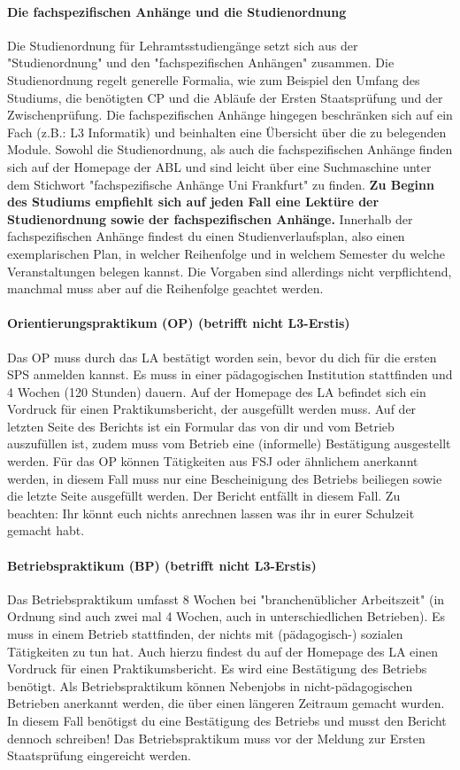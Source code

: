 \paragraph{Die fachspezifischen Anhänge und die Studienordnung}
Die Studienordnung für Lehramtsstudiengänge setzt sich aus der
"Studienordnung" und den "fachspezifischen Anhängen" zusammen. Die Studienordnung regelt generelle Formalia, wie zum Beispiel den Umfang des Studiums, die benötigten CP und die Abläufe der Ersten Staatsprüfung und der Zwischenprüfung.
Die fachspezifischen Anhänge hingegen beschränken sich auf ein Fach (z.B.: L3 Informatik) und beinhalten eine Übersicht über die zu belegenden Module.
Sowohl die Studienordnung, als auch die fachspezifischen Anhänge finden sich auf der Homepage der ABL und sind leicht über eine Suchmaschine unter dem Stichwort "fachspezifische Anhänge Uni Frankfurt" zu finden.
\textbf{Zu Beginn des Studiums empfiehlt sich auf jeden Fall eine Lektüre der Studienordnung sowie der fachspezifischen Anhänge.}
Innerhalb der fachspezifischen Anhänge findest du einen Studienverlaufsplan, also einen exemplarischen Plan, in welcher Reihenfolge und in welchem Semester du welche Veranstaltungen belegen kannst. Die Vorgaben sind allerdings nicht verpflichtend, manchmal muss aber auf die Reihenfolge geachtet werden.

\paragraph{Orientierungspraktikum (OP) (betrifft nicht L3-Erstis)}
Das OP muss durch das LA bestätigt worden sein, bevor du dich für die ersten SPS anmelden kannst. Es muss in einer pädagogischen Institution stattfinden und 4 Wochen (120 Stunden) dauern. Auf der Homepage des LA befindet sich ein Vordruck für einen Praktikumsbericht, der ausgefüllt werden muss. Auf der letzten Seite des Berichts ist ein Formular das von dir und vom Betrieb auszufüllen ist, zudem muss vom Betrieb eine (informelle) Bestätigung ausgestellt werden.
Für das OP können Tätigkeiten aus FSJ oder ähnlichem anerkannt werden, in diesem Fall muss nur eine Bescheinigung des Betriebs beiliegen sowie die letzte Seite ausgefüllt werden. Der Bericht entfällt in diesem Fall.
Zu beachten: Ihr könnt euch nichts anrechnen lassen was ihr in eurer Schulzeit gemacht habt.

\paragraph{Betriebspraktikum (BP) (betrifft nicht L3-Erstis)}
Das Betriebspraktikum umfasst 8 Wochen bei "branchenüblicher Arbeitszeit" (in Ordnung sind auch zwei mal 4 Wochen, auch in unterschiedlichen Betrieben). Es muss in einem Betrieb stattfinden, der nichts mit (pädagogisch-) sozialen Tätigkeiten zu tun hat. Auch hierzu findest du auf der Homepage des LA einen Vordruck für einen Praktikumsbericht. Es wird eine Bestätigung des Betriebs benötigt.
Als Betriebspraktikum können Nebenjobs in nicht-pädagogischen Betrieben anerkannt werden, die über einen längeren Zeitraum gemacht wurden. In diesem Fall benötigst du eine Bestätigung des Betriebs und musst den Bericht dennoch schreiben!
Das Betriebspraktikum muss vor der Meldung zur Ersten Staatsprüfung eingereicht werden.
\spaltenende
